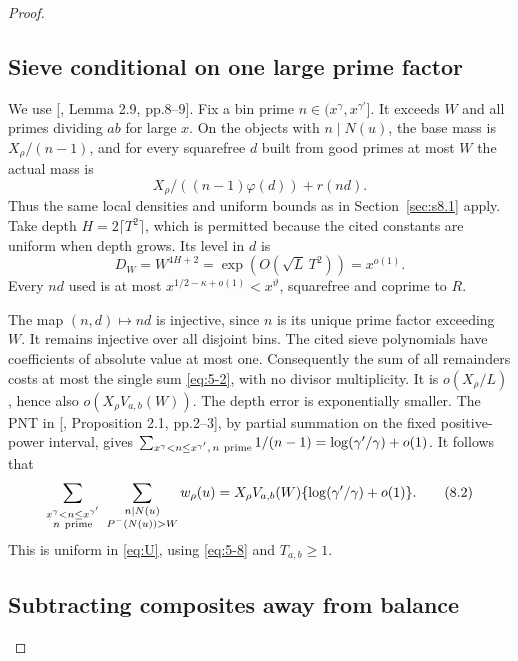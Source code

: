 \documentclass[11pt]{article}
\theoremstyle{definition}
\theoremstyle{definition}
\begin{document}
\begin{proof}
\subsection{Sieve conditional on one large prime factor}\label{sec:s8.2}

We use [, Lemma 2.9, pp.8--9]. Fix a bin prime \(n\in(x^\gamma,x^{\gamma'}]\). It exceeds \(W\) and all primes dividing \(ab\) for large \(x\). On the objects with \(n\mid N(u)\), the base mass is \(X_\rho/(n-1)\), and for every squarefree \(d\) built from good primes at most \(W\) the actual mass is
\begin{equation*}
X_\rho/((n-1)\varphi(d))+r(nd).
\end{equation*}
Thus the same local densities and uniform bounds as in Section~\ref{sec:s8.1} apply. Take depth \(H=2\lceil T^2\rceil\), which is permitted because the cited constants are uniform when depth grows. Its level in \(d\) is
\begin{equation*}
D_W=W^{4H+2}=\exp(O(\sqrt L\,T^2))=x^{o(1)}.
\end{equation*}
Every \(nd\) used is at most \(x^{1/2-\kappa+o(1)}<x^\vartheta\), squarefree and coprime to \(R\).

The map \((n,d)\mapsto nd\) is injective, since \(n\) is its unique prime factor exceeding \(W\). It remains injective over all disjoint bins. The cited sieve polynomials have coefficients of absolute value at most one. Consequently the sum of all remainders costs at most the single sum \eqref{eq:5-2}, with no divisor multiplicity. It is \(o(X_\rho/L)\), hence also \(o(X_\rho V_{a,b}(W))\). The depth error is exponentially smaller. The PNT in [, Proposition 2.1, pp.2--3], by partial summation on the fixed positive-power interval, gives
\(\sum_{x^\gamma<n\le x^{\gamma'},\,n\ {\rm prime}}1/(n-1)=\log(\gamma'/\gamma)+o(1)\).
It follows that
\begin{equation}
\sum_{\substack{x^\gamma<n\le x^{\gamma'}\\n\ {\rm prime}}}
 \ \sum_{\substack{n\mid N(u)\\P^-(N(u))>W}}w_\rho(u)
 =X_\rho V_{a,b}(W)\{\log(\gamma'/\gamma)+o(1)\}.          \tag{8.2}\label{eq:8-2}
\end{equation}
This is uniform in \eqref{eq:U}, using \eqref{eq:5-8} and \(T_{a,b}\ge1\).

\subsection{Subtracting composites away from balance}\label{sec:s8.3}


\end{proof}
\end{document}
